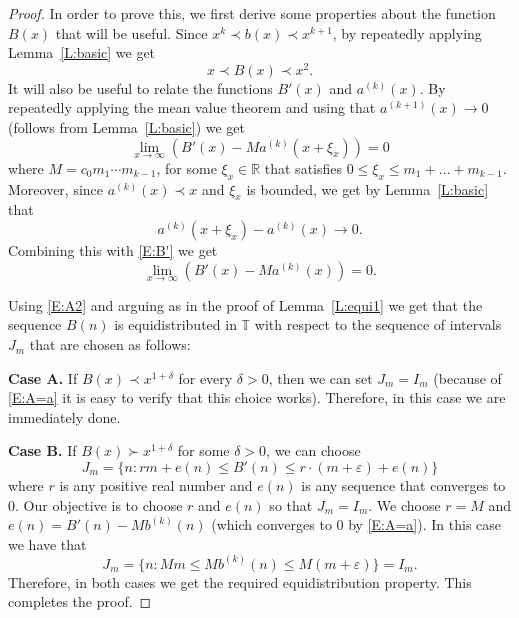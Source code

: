 \documentclass[11pt]{amsart}
\newcommand{\T}{\mathbb{T}}
\newcommand{\R}{\mathbb{R}}
\theoremstyle{plain}
\theoremstyle{definition}
\theoremstyle{remark}
\begin{document}
\begin{proof}
In order to prove this, we first derive some  properties about the function $B(x)$ that will be useful.  Since $x^k\prec b(x) \prec x^{k+1}$, by
repeatedly applying Lemma~\ref{L:basic} we get
\begin{equation}\label{E:A2}
  x\prec B(x)\prec x^2.
\end{equation}
It will also be useful to relate the functions $B'(x)$ and
$a^{(k)}(x)$.  By repeatedly applying the mean value theorem and using
that $a^{(k+1)}(x)\to 0$ (follows from Lemma~\ref{L:basic}) we get
\begin{equation}\label{E:B'}
  \lim_{x\to\infty} (B'(x)-M a^{(k)}(x+\xi_x))= 0
\end{equation}
where $M=c_0 m_1\cdots m_{k-1}$, for some $\xi_x\in \R$ that satisfies
$0\leq \xi_x\leq m_1+\ldots+m_{k-1}$.  Moreover, since
$a^{(k)}(x)\prec x$ and $\xi_x$ is bounded, we get by
Lemma~\ref{L:basic} that
 $$
 a^{(k)}(x+\xi_x)-a^{(k)}(x)\to 0.
 $$
 Combining this with \eqref{E:B'} we get
 \begin{equation}\label{E:A=a}
   \lim_{x\to\infty}(B'(x)-M a^{(k)}(x))= 0.
 \end{equation}

 Using \eqref{E:A2} and arguing as in the proof of Lemma~\ref{L:equi1}
 we get that the sequence $B(n)$ is equidistributed in $\T$ with
 respect to the sequence of intervals $J_m$ that are chosen as
 follows:

 {\bf Case A.} If $B(x)\prec x^{1+\delta}$ for every $\delta>0$,
 then we can  set $J_m=I_m$
 (because of \eqref{E:A=a} it is easy to verify that
 this choice works). Therefore,  in this case we are immediately done.

 {\bf Case B.}  If $ B(x)\succ x^{1+\delta}$ for some $\delta>0$, we
 can choose
$$
J_m=\{n\colon r m+e(n) \leq B'(n)\leq r\cdot (m+\varepsilon)+e(n)\}
$$
where $r$ is any positive real number and $e(n)$ is any sequence that
converges to $0$.  Our objective is to choose $r$ and $e(n)$ so that
$J_m=I_m$.  We choose $r=M$ and $e(n)=B'(n)-Mb^{(k)}(n)$ (which
converges to $0$ by \eqref{E:A=a}). In this case we have that $$
J_m=\{n\colon Mm\leq Mb^{(k)}(n)\leq M(m+\varepsilon)\}=I_m.
 $$
Therefore,  in both cases we get the required equidistribution property. This completes the proof.
\end{proof}
\end{document}

